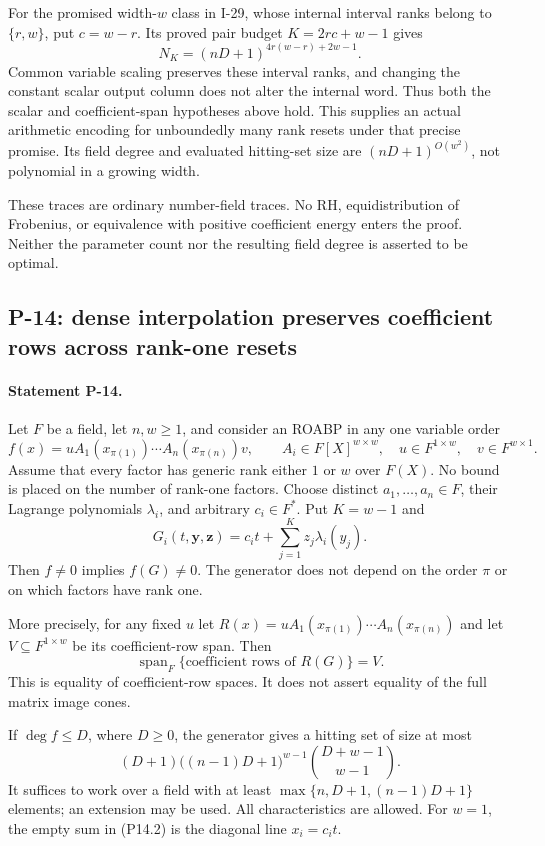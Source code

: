 \documentclass[11pt,a4paper]{article}
\theoremstyle{definition}\newtheorem{definition}{Definition}
\begin{document}
For the promised width-$w$ class in I-29, whose internal interval
ranks belong to $\{r,w\}$, put $c=w-r$. Its proved pair budget
$K=2rc+w-1$ gives
\[
 N_K=(nD+1)^{4r(w-r)+2w-1}.
\]
Common variable scaling preserves these interval ranks, and
changing the constant scalar output column does not alter the
internal word. Thus both the scalar and coefficient-span
hypotheses above hold. This supplies an actual arithmetic
encoding for unboundedly many rank resets under that precise
promise. Its field degree and evaluated hitting-set size are
$(nD+1)^{O(w^2)}$, not polynomial in a growing width.

These traces are ordinary number-field traces. No RH,
equidistribution of Frobenius, or equivalence with positive coefficient
energy enters the proof. Neither the parameter count nor
the resulting field degree is asserted to be optimal.


\subsection{P-14: dense interpolation preserves coefficient rows across rank-one resets}
\paragraph{Statement P-14.}
Let $F$ be a field, let $n,w\geq1$, and consider an ROABP in any
one variable order
\[
 f(x)=uA_1(x_{\pi(1)})\cdots A_n(x_{\pi(n)})v,
 \qquad A_i\in F[X]^{w\times w},\quad
 u\in F^{1\times w},\quad v\in F^{w\times1}.
 \tag{P14.1}
\]
Assume that every factor has generic rank either $1$ or $w$ over
$F(X)$. No bound is placed on the number of rank-one factors.
Choose distinct $a_1,\ldots,a_n\in F$, their Lagrange polynomials
$\lambda_i$, and arbitrary $c_i\in F^*$. Put $K=w-1$ and
\[
 G_i(t,\mathbf y,\mathbf z)
       =c_it+\sum_{j=1}^{K}z_j\lambda_i(y_j).
 \tag{P14.2}
\]
Then $f\ne0$ implies $f(G)\ne0$. The generator does not depend
on the order $\pi$ or on which factors have rank one.

More precisely, for any fixed $u$ let
$R(x)=uA_1(x_{\pi(1)})\cdots A_n(x_{\pi(n)})$ and let
$V\subseteq F^{1\times w}$ be its coefficient-row span. Then
\[
 \operatorname{span}_F\{\text{coefficient rows of }R(G)\}=V.
 \tag{P14.3}
\]
This is equality of coefficient-row spaces. It does not assert
equality of the full matrix image cones.

If $\deg f\leq D$, where $D\geq0$, the generator gives a hitting
set of size at most
\[
 (D+1)\bigl((n-1)D+1\bigr)^{w-1}
             \binom{D+w-1}{w-1}.
 \tag{P14.4}
\]
It suffices to work over a field with at least
$\max\{n,D+1,(n-1)D+1\}$ elements; an extension may be used.
All characteristics are allowed. For $w=1$, the empty sum in
(P14.2) is the diagonal line $x_i=c_it$.
\end{document}
